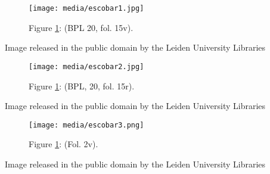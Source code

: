 \documentclass{article}
\begin{document}
\begin{figure}[H]
  \centering
    \texttt{[image: media/escobar1.jpg]}
    \caption{Figure \ref{fig:escobar1}: (BPL 20, fol. 15v).}
    \label{fig:escobar1}
  \end{figure}

 Image released in the public domain by the Leiden University Libraries 


  \begin{figure}
    \texttt{[image: media/escobar2.jpg]}
    \caption{Figure \ref{fig:escobar1}: (BPL, 20, fol. 15r).}
    \label{fig:escobar2}
\end{figure}

 Image released in the public domain by the Leiden University Libraries 


\begin{figure}[H]
  \centering
  \texttt{[image: media/escobar3.png]}
    \caption{Figure \ref{fig:escobar1}: (Fol. 2v).}
    \label{fig:escobar3}
  \end{figure}

 Image released in the public domain by the Leiden University Libraries 
\end{document}
